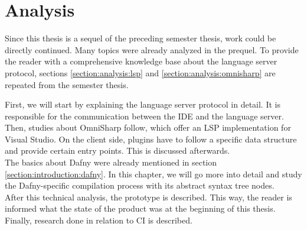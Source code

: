 \section{Analysis}
\label{section:analysis}
Since this thesis is a sequel of the preceding semester thesis, work could be directly continued.
Many topics were already analyzed in the prequel.
To provide the reader with a comprehensive knowledge base about the language server protocol,
sections \ref{section:analysis:lsp} and \ref{section:analysis:omnisharp} are repeated from the semester thesis.\\ 

First, we will start by explaining the language server protocol in detail.
It is responsible for the communication between the IDE and the language server.
Then, studies about OmniSharp follow, which offer an LSP implementation for Visual Studio.
On the client side, plugins have to follow a specific data structure and provide certain entry points.
This is discussed afterwards.\\

The basics about Dafny were already mentioned in section \ref{section:introduction:dafny}.
In this chapter, we will go more into detail and study the Dafny-specific compilation process with its abstract syntax tree nodes.\\

After this technical analysis, the prototype is described.
This way, the reader is informed what the state of the product was at the beginning of this thesis.
Finally, research done in relation to CI is described. 


